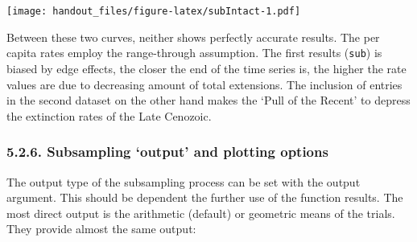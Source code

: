 \documentclass[]{article}
\begin{document}
\texttt{[image: handout\_files/figure-latex/subIntact-1.pdf]}

Between these two curves, neither shows perfectly accurate results. The
per capita rates employ the range-through assumption. The first results
(\texttt{sub}) is biased by edge effects, the closer the end of the time
series is, the higher the rate values are due to decreasing amount of
total extensions. The inclusion of entries in the second dataset on the
other hand makes the `Pull of the Recent' to depress the extinction
rates of the Late Cenozoic.

\hypertarget{subsampling-output-and-plotting-options}{%
\subsubsection{5.2.6. Subsampling `output' and plotting
options}\label{subsampling-output-and-plotting-options}}

The output type of the subsampling process can be set with the output
argument. This should be dependent the further use of the function
results. The most direct output is the arithmetic (default) or geometric
means of the trials. They provide almost the same output:
\end{document}
